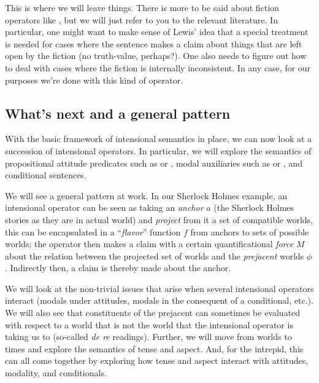 This is where we will leave things. There is more to be said about fiction
operators like , but we will just
refer to you to the relevant literature. In particular, one might want to make
sense of Lewis' idea that a special treatment is needed for cases where the
sentence makes a claim about things that are left open by the fiction (no
truth-value, perhaps?). One also needs to figure out how to deal with cases
where the fiction is internally inconsistent. In any case, for our purposes
we're done with this kind of operator.

\subsection{What's next and a general pattern}
\label{sec:next}

With the basic framework of intensional semantics in place, we can now look at a
succession of intensional operators. In particular, we will explore the
semantics of propositional attitude predicates such as  or
, modal auxiliaries such as  or
, and conditional sentences.

We will see a general pattern at work. In our Sherlock Holmes example, an
intensional operator can be seen as taking an \emph{anchor} \(a\) (the Sherlock
Holmes stories as they are in actual world) and \emph{project} from it a set of
compatible worlds, this can be encapsulated in a ``\emph{flavor}'' function
\(f\) from anchors to sets of possible worlds; the operator then makes a claim
with a certain quantificational \emph{force} \(M\) about the relation between
the projected set of worlds and the \emph{prejacent} worlds \(\phi\). Indirectly
then, a claim is thereby made about the anchor.

We will look at the non-trivial issues that arise when several intensional
operators interact (modals under attitudes, modals in the consequent of a
conditional, etc.). We will also see that constituents of the prejacent can
sometimes be evaluated with respect to a world that is not the world that the
intensional operator is taking us to (so-called \emph{de re} readings). Further,
we will move from worlds to times and explore the semantics of tense and aspect.
And, for the intrepid, this can all come together by exploring how tense and
aspect interact with attitudes, modality, and conditionals.

